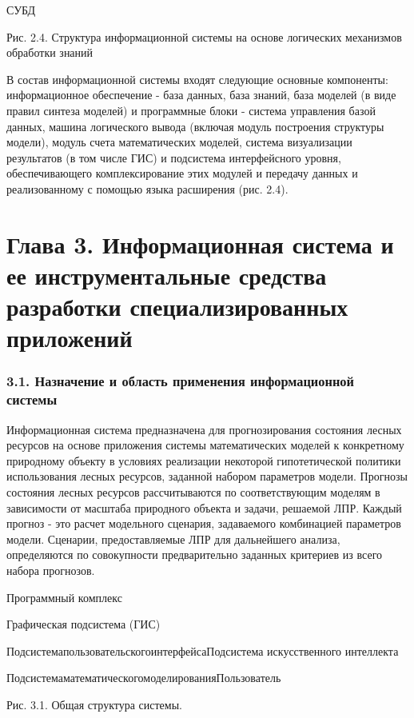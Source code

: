 \documentclass{article}
\begin{document}
СУБД\fancyfoot[LE]{\thepage{}}
\fancyfoot[LO]{\thepage{}}

\begin{center}
Рис. 2.4. Структура информационной системы на 
основе логических механизмов обработки знаний
\end{center}

В  состав информационной системы входят следующие 
основные компоненты: информационное обеспечение 
- база данных, база знаний, база моделей (в виде 
правил синтеза моделей) и программные блоки 
- система управления базой данных, машина логического 
вывода (включая модуль построения структуры 
модели), модуль счета математических моделей, 
система визуализации результатов (в том числе 
ГИС) и подсистема интерфейсного уровня, обеспечивающего 
комплексирование этих модулей и передачу данных 
и реализованному с помощью языка расширения 
(рис. 2.4).\pagebreak{}\label{HToc199746724}

\section*{\textbf{Глава 3. Информационная система и 
ее инструментальные средства разработки специализированных  приложений\label{HToc199746725}}}

\subsubsection*{\textbf{3.1. Назначение и область применения 
информационной системы}}

Информационная система предназначена для прогнозирования 
состояния лесных ресурсов на основе приложения 
системы математических моделей к конкретному 
природному объекту в условиях реализации некоторой 
гипотетической политики использования лесных 
ресурсов, заданной набором параметров модели. 
Прогнозы состояния лесных ресурсов рассчитываются 
по соответствующим моделям в зависимости от 
масштаба природного объекта и задачи, решаемой 
ЛПР.  Каждый прогноз - это расчет модельного 
сценария, задаваемого комбинацией параметров 
модели. Сценарии, предоставляемые ЛПР для дальнейшего 
анализа, определяются по совокупности предварительно 
заданных критериев из всего набора прогнозов.

Программный комплекс

\begin{center}
Графическая
подсистема (ГИС)

ПодсистемапользовательскогоинтерфейсаПодсистема 
искусственного интеллекта

ПодсистемаматематическогомоделированияПользователь\fancyfoot[LE]{\thepage{}}
\fancyfoot[LO]{\thepage{}}

Рис. 3.1. Общая структура системы. 
\end{center}
\end{document}
